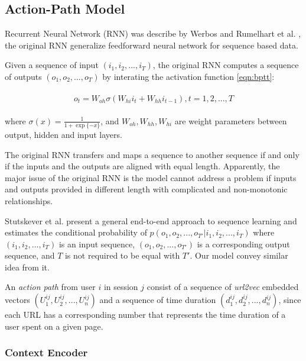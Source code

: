 \subsection{Action-Path Model}


Recurrent Neural Network (RNN) was describe by Werbos \cite{werbos1990rnn} and 
Rumelhart et al. \cite{Rumelhart:1988:LRB:65669.104451}, the original RNN 
generalize feedforward neural network for sequence based data.

Given a sequence of input $(i_1, i_2, ..., i_T)$, the original RNN computes a
sequence of outputs $(o_1, o_2, ..., o_T)$ by interating the activation function \ref{eqn:bptt}:

\begin{align}
\label{eqn:bptt}
\begin{split}
    o_t = W_{oh} \sigma \left( W_{hi}i_{t} + W_{hh}i_{t-1}\right), t=1,2,...,T
\end{split}
\end{align}

where $\sigma(x) = \frac{1}{1+\exp\{-x\}}$,
and $W_{oh}, W_{hh}, W_{hi}$ are weight parameters between output, hidden and input layers.

The original RNN transfers and maps a sequence to another sequence if and only if the inputs
and the outputs are aligned with equal length. Apparently, the major issue of the original RNN
is the model cannot address a problem if inputs and outputs provided in different length with 
complicated and non-monotonic relationships.

Stutskever et al. \cite{DBLP:journals/corr/SutskeverVL14} present a general end-to-end approach
to sequence learning and estimates the conditional probability of 
$p(o_1, o_2, ..., o_{T'} | i_1, i_2, ..., i_T)$ where $(i_1, i_2, ..., i_T)$ is an input sequence,
$(o_1, o_2, ..., o_{T'})$ is a corresponding output sequence, and $T$ is not required to be equal with $T'$.
Our model convey similar idea from it.

An \emph{action path} from user $i$ in session $j$ consist of 
a sequence of \emph{url2vec} embedded vectors $(U^{ij}_1, U^{ij}_2, ..., U^{ij}_n)$ 
and a sequence of time duration $(d^{ij}_1, d^{ij}_2, ..., d^{ij}_n)$, since each URL 
has a corresponding number that represents the time duration of a user spent on a given page.

\subsubsection{Context Encoder}

